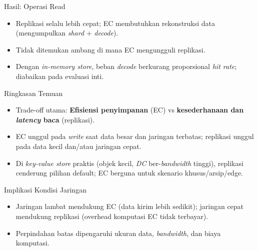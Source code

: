 \documentclass[a2,portrait]{config/poster/a0poster}
\newcommand{\postersection}[1]{%
	\begin{tcolorbox}[
		colback=ITBblue,
		colframe=ITBblue,
		fonttitle=\bfseries,
		coltext=white,
		sharp corners,
		boxrule=0pt,
		top=0pt,
		bottom=0pt,
		halign=center
	]
	\normalsize #1
	\end{tcolorbox}%
}
\begin{document}
\begin{multicols}{2}

\postersection{Hasil: Operasi Read}
\begin{itemize}[leftmargin=*, itemsep=2pt]
	\item Replikasi selalu lebih cepat; EC membutuhkan rekonstruksi data (mengumpulkan \textit{shard} + \textit{decode}).
	\item Tidak ditemukan ambang di mana EC mengungguli replikasi.
	\item Dengan \textit{in-memory store}, beban \textit{decode} berkurang proporsional \textit{hit rate}; diabaikan pada evaluasi inti.
\end{itemize}


\postersection{Ringkasan Temuan}
\begin{itemize}[leftmargin=*, itemsep=2pt]
	\item Trade-off utama: \textbf{Efisiensi penyimpanan} (EC) vs \textbf{kesederhanaan dan \textit{latency} baca} (replikasi).
	\item EC unggul pada \textit{write} saat data besar dan jaringan terbatas; replikasi unggul pada data kecil dan/atau jaringan cepat.
	\item Di \textit{key-value store} praktis (objek kecil, \textit{DC} ber-\textit{bandwidth} tinggi), replikasi cenderung pilihan default; EC berguna untuk skenario khusus/arsip/edge.
\end{itemize}


\postersection{Implikasi Kondisi Jaringan}
\begin{itemize}[leftmargin=*, itemsep=2pt]
	\item Jaringan lambat mendukung EC (data kirim lebih sedikit); jaringan cepat mendukung replikasi (overhead komputasi EC tidak terbayar).
	\item Perpindahan batas dipengaruhi ukuran data, \textit{bandwidth}, dan biaya komputasi.
\end{itemize}


\end{multicols}
\end{document}
